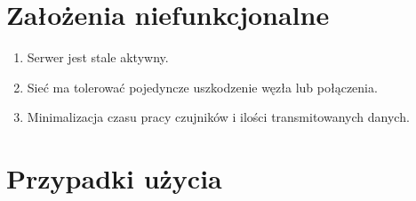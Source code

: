 \documentclass[a4paper,11pt]{article}
\begin{document}
\section{Założenia niefunkcjonalne}

\begin{enumerate}
  \item Serwer jest stale aktywny.
  \item Sieć ma tolerować pojedyncze uszkodzenie węzła lub połączenia.
  \item Minimalizacja czasu pracy czujników i ilości transmitowanych danych.
\end{enumerate}

\section{Przypadki użycia}\label{PU}
\end{document}
